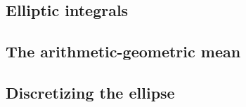 \subsection{Elliptic integrals}


\subsection{The arithmetic-geometric mean}


\subsection{Discretizing the ellipse}

